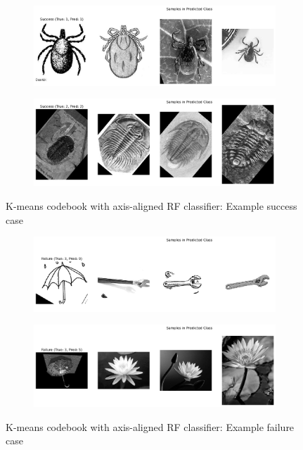 \begin{figure}[htbp]
	\centering
	\begin{subfigure}{0.45\linewidth}
		\centering
		\includegraphics[width=\linewidth]{image/conf-appendix/km_axis_succ1.png}
	\end{subfigure}%
	\quad
	\begin{subfigure}{0.45\linewidth}
		\centering
		\includegraphics[width=\linewidth]{image/conf-appendix/km_axis_succ2.png}
	\end{subfigure}
	\caption{K-means codebook with axis-aligned RF classifier: Example success case}
	\label{fig:APP-q2-case1}
\end{figure}
\begin{figure}[htbp]
	\centering
	\begin{subfigure}[t]{0.45\linewidth}
		\centering
		\includegraphics[width=\linewidth]{image/conf-appendix/km_axis_fail2.png}
	\end{subfigure}%
	\quad
	\begin{subfigure}[t]{0.45\linewidth}
		\centering
		\includegraphics[width=\linewidth]{image/conf-appendix/km_axis_fail3.png}
	\end{subfigure}
	\caption{K-means codebook with axis-aligned RF classifier: Example failure case}
	\label{fig:APP-q2-case2}
\end{figure}

